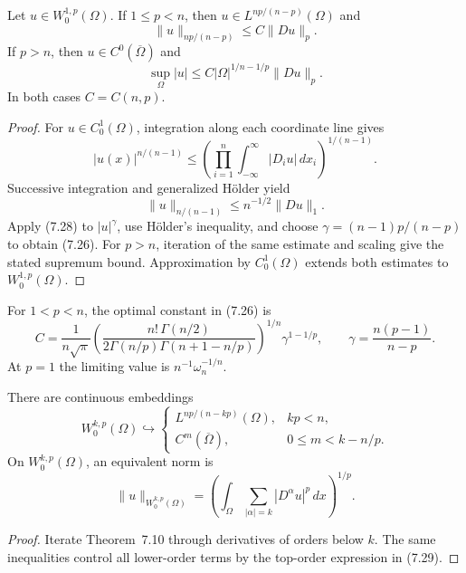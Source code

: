 \begin{theorem}
\label{gt:thm-sobolev-embedding-basic}
Let $u\in W_0^{1,p}(\Omega)$. If $1\leq p<n$, then
$u\in L^{np/(n-p)}(\Omega)$ and
\begin{equation}
\tag{7.26}
\|u\|_{np/(n-p)}\leq C\|Du\|_p.
\end{equation}
If $p>n$, then $u\in C^0(\overline\Omega)$ and
\[
\sup_\Omega|u|\leq C|\Omega|^{1/n-1/p}\|Du\|_p.
\]
In both cases $C=C(n,p)$.
\end{theorem}
\begin{proof}
\sketch For $u\in C_0^1(\Omega)$, integration along each coordinate line
gives
\begin{equation}
\tag{7.27}
|u(x)|^{n/(n-1)}
\leq\left(\prod_{i=1}^n\int_{-\infty}^{\infty}|D_i u|\,dx_i
\right)^{1/(n-1)}.
\end{equation}
Successive integration and generalized H\"older yield
\begin{equation}
\tag{7.28}
\|u\|_{n/(n-1)}\leq n^{-1/2}\|Du\|_1.
\end{equation}
Apply (7.28) to $|u|^\gamma$, use H\"older's inequality, and choose
$\gamma=(n-1)p/(n-p)$ to obtain (7.26). For $p>n$, iteration of the same
estimate and scaling give the stated supremum bound. Approximation by
$C_0^1(\Omega)$ extends both estimates to $W_0^{1,p}(\Omega)$.
\end{proof}

\begin{remark}
\label{gt:rem-sobolev-sharp-constant}
For $1<p<n$, the optimal constant in (7.26) is
\[
C=\frac1{n\sqrt\pi}
\left(\frac{n!\,\Gamma(n/2)}{2\Gamma(n/p)\Gamma(n+1-n/p)}\right)^{1/n}
\gamma^{1-1/p},
\qquad \gamma=\frac{n(p-1)}{n-p}.
\]
At $p=1$ the limiting value is $n^{-1}\omega_n^{-1/n}$.
\end{remark}

\begin{corollary}
\label{gt:cor-sobolev-embedding-higher-order}
There are continuous embeddings
\[
W_0^{k,p}(\Omega)\hookrightarrow
\begin{cases}
L^{np/(n-kp)}(\Omega),&kp<n,\\
C^m(\overline\Omega),&0\leq m<k-n/p.
\end{cases}
\]
On $W_0^{k,p}(\Omega)$, an equivalent norm is
\begin{equation}
\tag{7.29}
\|u\|_{W_0^{k,p}(\Omega)}
=\left(\int_\Omega\sum_{|\alpha|=k}|D^\alpha u|^p\,dx\right)^{1/p}.
\end{equation}
\end{corollary}
\begin{proof}
\sketch Iterate Theorem~7.10 through derivatives of orders below $k$. The
same inequalities control all lower-order terms by the top-order expression
in (7.29).
\end{proof}

